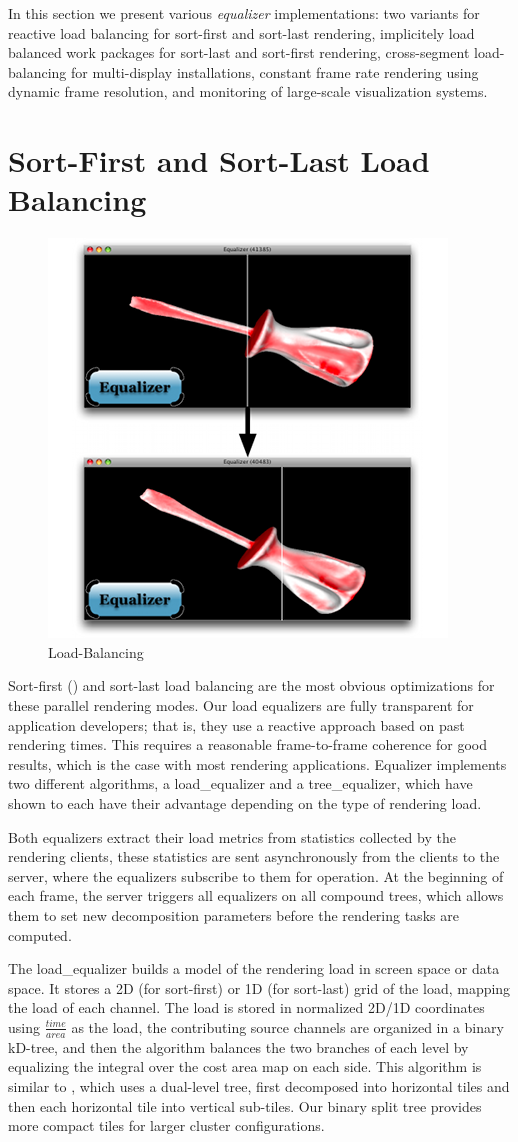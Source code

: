 In this section we present various {\em equalizer} implementations: two
variants for reactive load balancing for sort-first and sort-last rendering,
implicitely load balanced work packages for sort-last and sort-first rendering,
cross-segment load-balancing for multi-display installations, constant frame
rate rendering using dynamic frame resolution, and monitoring of large-scale
visualization systems.

\section{Sort-First and Sort-Last Load Balancing}\label{sLoadEqualizer}

\begin{figure}
  \includegraphics[width=.382\textwidth]{images/loadeq}
  \caption{\label{floadeq}Load-Balancing}
\end{figure}

Sort-first () and sort-last load balancing are the most obvious
optimizations for these parallel rendering modes. Our load equalizers are fully
transparent for application developers; that is, they use a reactive approach
based on past rendering times. This requires a reasonable frame-to-frame
coherence for good results, which is the case with most rendering applications.
Equalizer implements two different algorithms, a \textsf{load\_equalizer} and a
\textsf{tree\_equalizer}, which have shown to each have their advantage
depending on the type of rendering load.

Both equalizers extract their load metrics from statistics collected by the
rendering clients, these statistics are sent asynchronously from the clients to
the server, where the equalizers subscribe to them for operation. At the
beginning of each frame, the server triggers all equalizers on all compound
trees, which allows them to set new decomposition parameters before the
rendering tasks are computed.

The \textsf{load\_equalizer} builds a model of the rendering load in screen
space or data space. It stores a 2D (for sort-first) or 1D (for sort-last) grid
of the load, mapping the load of each channel. The load is stored in normalized
2D/1D coordinates using $\frac{time}{area}$ as the load, the contributing source
channels are organized in a binary kD-tree, and then the algorithm balances the
two branches of each level by equalizing the integral over the cost area map on
each side. This algorithm is similar to \cite{ACCC:04}, which uses a dual-level
tree, first decomposed into horizontal tiles and then each horizontal tile into
vertical sub-tiles. Our binary split tree provides more compact tiles for larger
cluster configurations.

